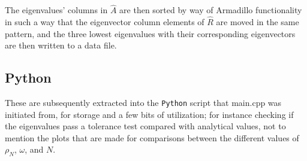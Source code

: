 \documentclass[11pt,a4paper,notitlepage]{article}
\begin{document}
The eigenvalues' columns in $\hat{A}$ are then sorted by way of Armadillo functionality in such a way that the eigenvector column elements of $\hat{R}$ are moved in the same pattern, and the three lowest eigenvalues with their corresponding eigenvectors are then written to a data file.

\subsection{Python}
These are subsequently extracted into the \verb|Python| script that main.cpp was initiated from, for storage and a few bits of utilization; for instance checking if the eigenvalues pass a tolerance test compared with analytical values, not to mention the plots that are made for comparisons between the different values of $\rho_N$, $\omega$, and $N$.
\end{document}
